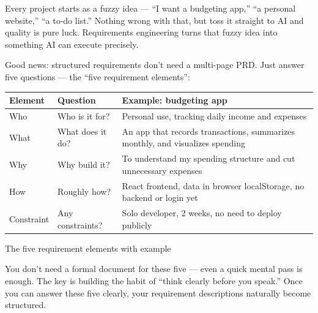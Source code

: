 


Every project starts as a fuzzy idea — “I want a budgeting app,” “a personal website,” “a to-do list.” Nothing wrong with that, but toss it straight to AI and quality is pure luck. Requirements engineering turns that fuzzy idea into something AI can execute precisely.

Good news: structured requirements don't need a multi-page PRD. Just answer five questions — the “five requirement elements”:

\begin{center}
\begin{tabularx}{\linewidth}{|X|X|X|}
\hline
\textbf{Element} & \textbf{Question} & \textbf{Example: budgeting app} \tabularnewline
\hline
Who & Who is it for? & Personal use, tracking daily income and expenses \tabularnewline
What & What does it do? & An app that records transactions, summarizes monthly, and visualizes spending \tabularnewline
Why & Why build it? & To understand my spending structure and cut unnecessary expenses \tabularnewline
How & Roughly how? & React frontend, data in browser localStorage, no backend or login yet \tabularnewline
Constraint & Any constraints? & Solo developer, 2 weeks, no need to deploy publicly \tabularnewline
\hline
\end{tabularx}
\end{center}

\begin{center}\small\color{gray}The five requirement elements with example\end{center}

You don't need a formal document for these five — even a quick mental pass is enough. The key is building the habit of “think clearly before you speak.” Once you can answer these five clearly, your requirement descriptions naturally become structured.


